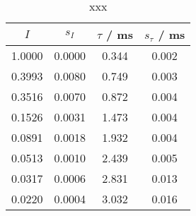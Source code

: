 \begin{table}[H]
\caption{xxx}
\begin{center}
\begin{tabular}{|c|c|c|c|}
  \hline
  $I$ & $s_I$ & $\tau$ / ms & $s_\tau$ / ms \\ \hline
  1.0000 & 0.0000 & 0.344 & 0.002 \\ \hline
  0.3993 & 0.0080 & 0.749 & 0.003 \\ \hline
  0.3516 & 0.0070 & 0.872 & 0.004 \\ \hline
  0.1526 & 0.0031 & 1.473 & 0.004 \\ \hline
  0.0891 & 0.0018 & 1.932 & 0.004 \\ \hline
  0.0513 & 0.0010 & 2.439 & 0.005 \\ \hline
  0.0317 & 0.0006 & 2.831 & 0.013 \\ \hline
  0.0220 & 0.0004 & 3.032 & 0.016 \\ \hline
\end{tabular}
\end{center}
\label{tab:deh:fitres}
\end{table}
